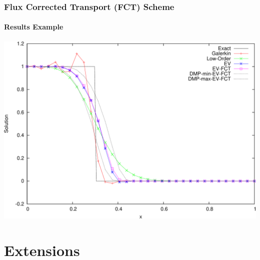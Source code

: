 \documentclass{beamer}
\begin{document}
\begin{frame}
\frametitle{Flux Corrected Transport (FCT) Scheme}
\framesubtitle{Results Example}

\includegraphics[width=\textwidth]{./figures/advection_FCT.pdf}

\end{frame}
\section{Extensions}
\end{document}
